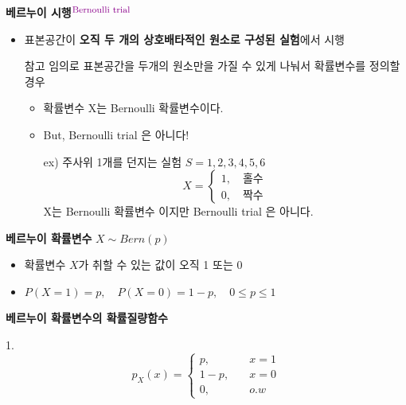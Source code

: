 \documentclass{oblivoir}
\newcommand{\DC}[1]{\textcolor{DarkMagenta}{#1}}%
\newcommand{\UP}[1]{$^{\mbox{\DC{\footnotesize #1}}}$}
\begin{document}
\textbf{베르누이 시행}\UP{Bernoulli trial}
\begin{itemize}
\item 표본공간이 \textbf{오직 두 개의 상호배타적인 원소로 구성된 실험}에서 시행

\begin{myframe}{\footnotesize 참고}
임의로 표본공간을 두개의 원소만을 가질 수 있게 나눠서 확률변수를 정의할 경우
\begin{itemize}
\item 확률변수 X는 Bernoulli 확률변수이다.
\item But, Bernoulli trial 은 아니다!
\item[ex)] 주사위 1개를 던지는 실험 $S = {1,2,3,4,5,6}$
$$
X = 
\begin{cases}
1, \quad \mbox{홀수} \\
0, \quad \mbox{짝수}
\end{cases}
$$
X는 Bernoulli 확률변수 이지만 Bernoulli trial 은 아니다. 
\end{itemize}
\end{myframe}
\end{itemize}
\textbf{베르누이 확률변수} $X \sim Bern(p)$
\begin{itemize}
\item 확률변수 $X$가 취할 수 있는 값이 오직 1 또는 0
\item $P(X=1) = p, \quad P(X=0) = 1-p, \quad 0 \leq p \leq 1$
\end{itemize}
\textbf{베르누이 확률변수의 확률질량함수}

1.
$$
p_X(x) = 
\begin{cases}
p, \quad &x = 1 \\
1-p, \quad &x = 0 \\
0, \quad &o.w
\end{cases}
$$
\end{document}
